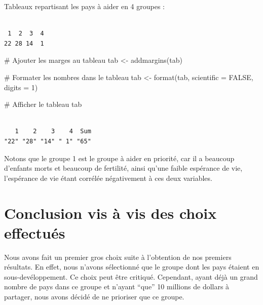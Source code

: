 \documentclass[
]{article}
\newenvironment{Shaded}{}{}
\newcommand{\AttributeTok}[1]{#1}
\newcommand{\CommentTok}[1]{\textcolor[rgb]{0.00,0.50,0.00}{#1}}
\newcommand{\ConstantTok}[1]{#1}
\newcommand{\DecValTok}[1]{#1}
\newcommand{\FunctionTok}[1]{#1}
\newcommand{\NormalTok}[1]{#1}
\newcommand{\OtherTok}[1]{\textcolor[rgb]{1.00,0.25,0.00}{#1}}
\newcommand{\SpecialCharTok}[1]{\textcolor[rgb]{0.00,0.50,0.50}{#1}}
\begin{document}
Tableaux repartisant les pays à aider en 4 groupes :

\begin{Shaded}
\end{Shaded}

\begin{verbatim}

 1  2  3  4 
22 28 14  1 
\end{verbatim}

\begin{Shaded}
\begin{Highlighting}[]
\CommentTok{\# Ajouter les marges au tableau}
\NormalTok{tab }\OtherTok{\textless{}{-}} \FunctionTok{addmargins}\NormalTok{(tab)}

\CommentTok{\# Formater les nombres dans le tableau}
\NormalTok{tab }\OtherTok{\textless{}{-}} \FunctionTok{format}\NormalTok{(tab, }\AttributeTok{scientific =} \ConstantTok{FALSE}\NormalTok{, }\AttributeTok{digits =} \DecValTok{1}\NormalTok{)}

\CommentTok{\# Afficher le tableau}
\NormalTok{tab}
\end{Highlighting}
\end{Shaded}

\begin{verbatim}

   1    2    3    4  Sum 
"22" "28" "14" " 1" "65" 
\end{verbatim}

Notons que le groupe 1 est le groupe à aider en priorité, car il a
beaucoup d'enfants morts et beaucoup de fertilité, ainsi qu'une faible
espérance de vie, l'espérance de vie étant corrélée négativement à ces
deux variables.

\hypertarget{conclusion-vis-uxe0-vis-des-choix-effectuuxe9s}{%
\section{Conclusion vis à vis des choix
effectués}\label{conclusion-vis-uxe0-vis-des-choix-effectuuxe9s}}

Nous avons fait un premier gros choix suite à l'obtention de nos
premiers résultats. En effet, nous n'avons sélectionné que le groupe
dont les pays étaient en sous-devéloppement. Ce choix peut être
critiqué. Cependant, ayant déjà un grand nombre de pays dans ce groupe
et n'ayant ``que'' 10 millions de dollars à partager, nous avons décidé
de ne prioriser que ce groupe.
\end{document}
